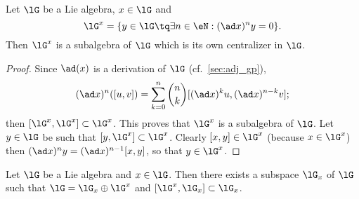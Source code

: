 \begin{proposition}\label{prop:G_x_central}
    Let $\lG$ be a Lie algebra, $x\in\lG$ and
        \begin{equation}
            \lG^x=\{y\in\lG\tq\exists n\in\eN:(\ad x)^ny=0\}.
        \end{equation}
    Then $\lG^x$ is a subalgebra of $\lG$ which is its own centralizer in $\lG$.
\end{proposition}

\begin{proof}
Since $\ad(x)$ is a derivation of $\lG$ (cf.~\ref{sec:adj_gp}),
\[
(\ad x)^n([u,v])=\sum_{k=0}^n \binom{n}{k} [ (\ad x)^ku,(\ad x)^{n-k}v ];
\]
then $[\lG^x,\lG^x]\subset\lG^x$. This proves that $\lG^x$ is a subalgebra of $\lG$. Let $y\in\lG$ be such that $[y,\lG^x]\subset\lG^x$. Clearly $[x,y]\in\lG^x$ (because $x\in\lG^x$) then $(\ad x)^ny=(\ad x)^{n-1}[x,y]$, so that $y\in\lG^x$.
\end{proof}

\begin{proposition}
Let $\lG$ be a Lie algebra and $x\in\lG$. Then there exists a subspace $\lG_x$ of $\lG$ such that $\lG=\lG_x\oplus\lG^x$ and $[\lG^x,\lG_x]\subset\lG_x$.
\label{prop:G_x_G_x}
\end{proposition}

